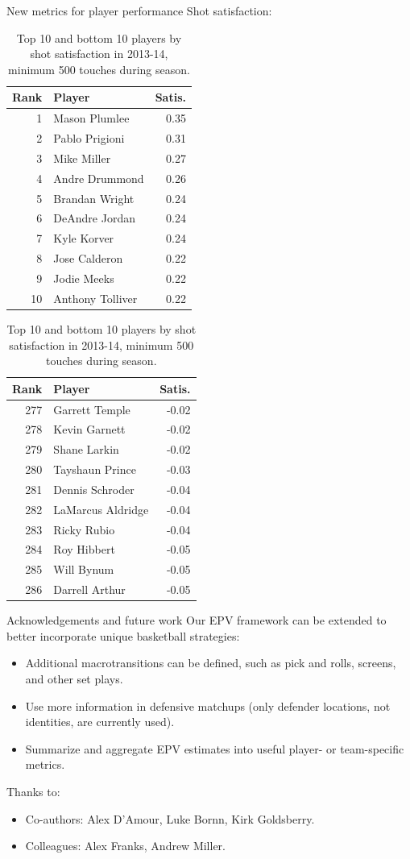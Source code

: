 \documentclass[10pt]{beamer}
\begin{document}
\begin{frame}{New metrics for player performance}
Shot satisfaction:
\begin{table}[ht]
\centering
\begin{tabular}{rlr}
  \toprule
Rank &  Player & Satis. \\
   \midrule
1 & Mason Plumlee & 0.35 \\
2 & Pablo Prigioni & 0.31 \\
3 & Mike Miller & 0.27 \\
4 & Andre Drummond & 0.26 \\
5 & Brandan Wright & 0.24 \\
6 & DeAndre Jordan & 0.24 \\
7 & Kyle Korver & 0.24 \\
8 & Jose Calderon & 0.22 \\
9 & Jodie Meeks & 0.22 \\
10 & Anthony Tolliver & 0.22 \\
\bottomrule
\end{tabular}
\quad
\begin{tabular}{rlr}
\toprule
Rank & Player & Satis. \\ 
\midrule
277 & Garrett Temple & -0.02 \\
278 & Kevin Garnett & -0.02 \\
279 & Shane Larkin & -0.02 \\
280 & Tayshaun Prince & -0.03 \\
281 & Dennis Schroder & -0.04 \\
282 & LaMarcus Aldridge & -0.04 \\
283 & Ricky Rubio & -0.04 \\
284 & Roy Hibbert & -0.05 \\
285 & Will Bynum & -0.05 \\
286 & Darrell Arthur & -0.05 \\
\bottomrule
\end{tabular}
\caption[]{Top 10 and bottom 10 players by shot satisfaction in 2013-14, minimum 500 touches during season.}
\end{table}
\end{frame}

\begin{frame}{Acknowledgements and future work}
Our EPV framework can be extended to better incorporate unique basketball strategies:
\begin{itemize}
\item Additional macrotransitions can be defined, such as pick and rolls, screens, and other set plays.
\item Use more information in defensive matchups (only defender locations, not identities, are currently used).
\item Summarize and aggregate EPV estimates into useful player- or team-specific metrics.
\end{itemize}
\pause
Thanks to:
\begin{itemize}
\item Co-authors: Alex D'Amour, Luke Bornn, Kirk Goldsberry.
\item Colleagues: Alex Franks, Andrew Miller.
\end{itemize}
\end{frame}
\end{document}
